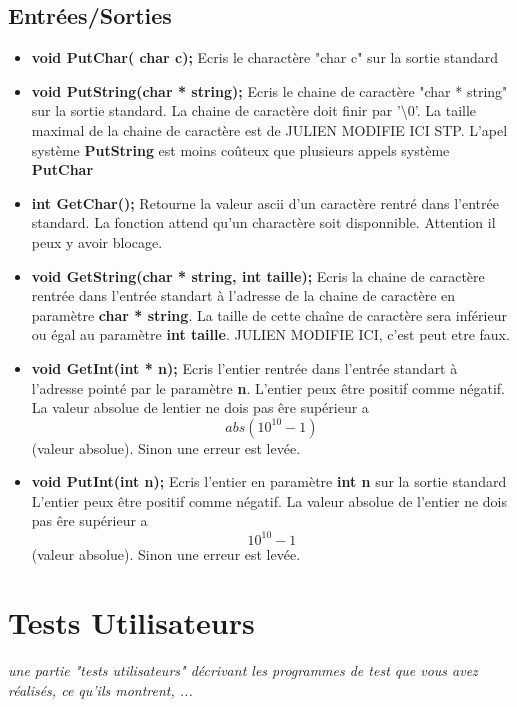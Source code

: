 \documentclass{article}
\begin{document}
\subsection{Entrées/Sorties}
\begin{itemize}
    \item 
    \textbf{void PutChar( char c);}
    Ecris le charactère "char c" sur la sortie standard
    
    \item 
    \textbf{void PutString(char * string);}
    Ecris le chaine de caractère "char * string" sur la sortie standard.
    La chaine de caractère doit finir par '\textbackslash0'.
    La taille maximal de la chaine de caractère est de 
    \colorbox{BurntOrange}{JULIEN MODIFIE ICI STP}.
    L'apel système \textbf{PutString} est moins coûteux que plusieurs appels système \textbf{PutChar}
    
     \item 
    \textbf{int GetChar();}
    Retourne la valeur ascii d'un caractère rentré dans l'entrée standard.
    La fonction attend qu'un charactère soit disponnible. Attention il peux y avoir blocage.
    
    
     \item 
    \textbf{void GetString(char * string, int taille);}
    Ecris la chaine de caractère rentrée dans l'entrée standart à l'adresse de la chaine de caractère en paramètre \textbf{char * string}. La taille de cette chaîne de caractère sera inférieur ou égal au paramètre \textbf{int taille}.
    \colorbox{BurntOrange}{JULIEN MODIFIE ICI, c'est peut etre faux}.
    
      \item 
    \textbf{void GetInt(int * n);}
    Ecris l'entier rentrée dans l'entrée standart à l'adresse pointé par le paramètre \textbf{n}.
    L'entier peux être positif comme négatif.
    La valeur absolue de lentier ne dois pas êre supérieur a \[abs(10^{10}-1)\] (valeur absolue). Sinon une erreur est levée.
    
    
    
      \item 
    \textbf{void PutInt(int n);}
     Ecris l'entier en paramètre \textbf{int n} sur la sortie standard
    L'entier peux être positif comme négatif.
    La valeur absolue de l'entier ne dois pas êre supérieur a \[10^{10}-1\] (valeur absolue). Sinon une erreur est levée.
    
    
\end{itemize}


\section{Tests Utilisateurs}
\textit{une partie "tests utilisateurs" décrivant les programmes de test que vous avez réalisés, ce qu'ils montrent, ...}
\vspace{5mm}
\end{document}
